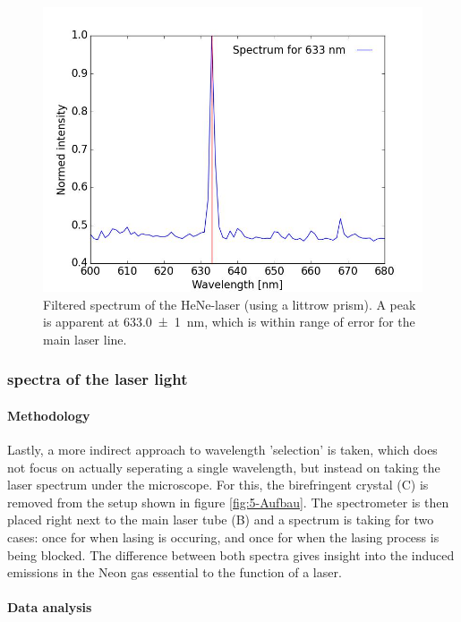 \documentclass[../main.tex]{subfiles}
\begin{document}
        \begin{figure}[H]
            \centering 
            \includegraphics[width = 15cm]{Bilddateien/5/5-Spektrenlittrowprisma.jpg}
            \caption{Filtered spectrum of the HeNe-laser (using a littrow prism). A peak is apparent at \SI{633.0(10)}{\nm}, which is within range of error for the main laser line.}
            \label{fig:5-Spektrenlittrowprisma}
        \end{figure}

\subsubsection{spectra of the laser light}
    \paragraph{Methodology}
    Lastly, a more indirect approach to wavelength 'selection' is taken, which does not focus on actually seperating a single wavelength, but instead on taking the laser spectrum under the microscope. For this, the birefringent crystal (C) is removed from the setup shown in figure \ref{fig:5-Aufbau}. The spectrometer is then placed right next to the main laser tube (B) and a spectrum is taking for two cases: once for when lasing is occuring, and once for when the lasing process is being blocked. The difference between both spectra gives insight into the induced emissions in the Neon gas essential to the function of a laser.

    \paragraph{Data analysis}
\end{document}
